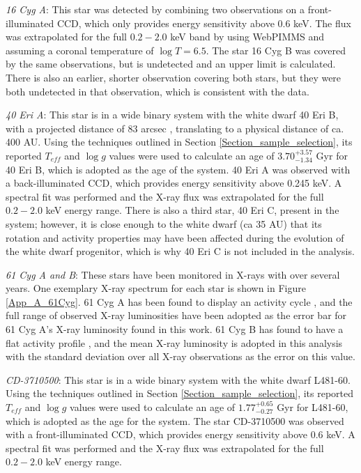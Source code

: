 \textit{16 Cyg A}: This star was detected by combining two \Chandra observations on a front-illuminated CCD, which only provides energy sensitivity above 0.6 keV. The flux was extrapolated for the full $0.2 - 2.0$ keV band by using WebPIMMS and assuming a coronal temperature of $\log T = 6.5$. The star 16 Cyg B was covered by the same observations, but is undetected and an upper limit is calculated. There is also an earlier, shorter \XMM observation covering both stars, but they were both undetected in that observation, which is consistent with the \Chandra data.

\textit{40 Eri A}: This star is in a wide binary system with the white dwarf 40 Eri B, with a projected distance of 83 arcsec \citep{Wenger_etal_2000}, translating to a physical distance of ca. 400 AU. Using the techniques outlined in Section \ref{Section_sample_selection}, its reported $T_{eff}$ and $\log g$ values \citep{Zhao_etal_2012} were used to calculate an age of $3.70^{+3.57}_{-1.34}$ Gyr for 40 Eri B, which is adopted as the age of the system. 40 Eri A was observed with a back-illuminated \Chandra CCD, which provides energy sensitivity above 0.245 keV. A spectral fit was performed and the X-ray flux was extrapolated for the full $0.2 - 2.0$ keV energy range. There is also a third star, 40 Eri C, present in the system; however, it is close enough to the white dwarf (ca 35 AU) that its rotation and activity properties may have been affected during the evolution of the white dwarf progenitor, which is why 40 Eri C is not included in the analysis.

\textit{61 Cyg A and B}: These stars have been monitored in X-rays with \XMM over several years. One exemplary X-ray spectrum for each star is shown in Figure \ref{App_A_61Cyg}. 61 Cyg A has been found to display an activity cycle \citep{Robrade_etal_2012}, and the full range of observed X-ray luminosities have been adopted as the error bar for 61 Cyg A's X-ray luminosity found in this work. 61 Cyg B has found to have a flat activity profile \citep{Robrade_etal_2012}, and the mean X-ray luminosity is adopted in this analysis with the standard deviation over all X-ray observations as the error on this value.

\textit{CD-3710500}: This star is in a wide binary system with the white dwarf L481-60. Using the techniques outlined in Section \ref{Section_sample_selection}, its reported $T_{eff}$ and $\log g$ values \citep{Zhao_etal_2012} were used to calculate an age of $1.77^{+0.65}_{-0.27}$ Gyr for L481-60, which is adopted as the age for the system. The star CD-3710500 was observed with a front-illuminated \Chandra CCD, which provides energy sensitivity above 0.6 keV. A spectral fit was performed and the X-ray flux was extrapolated for the full $0.2 - 2.0$ keV energy range.


